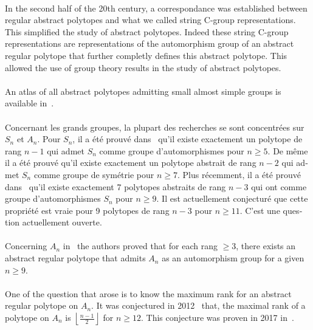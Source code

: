 \paragraph{}
In the second half of the 20th century, a correspondance was established between regular abstract polytopes and what we called string C-group representations. This simplified the study of abstract polytopes. Indeed these string C-group representations are representations of the automorphism group of an abstract regular polytope that further completly defines this abstract polytope. This allowed the use of group theory results in the study of abstract polytopes.

\paragraph{}
An atlas of all abstract polytopes admitting small almost simple groups is available in~\cite{atlasPolytopes}.

\begin{otherlanguage}{french}

\paragraph{}
Concernant les grands groupes, la plupart des recherches se sont concentrées sur $S_n$ et $A_n$. Pour $S_n$, il a été prouvé dans~\cite{highRankSym} qu'il existe exactement un polytope de rang $n-1$ qui admet $S_n$ comme groupe d'automorphismes pour $n \ge 5$. De même il a été prouvé qu'il existe exactement un polytope abstrait de rang $n-2$ qui admet $S_n$ comme groupe de symétrie pour $n \ge 7$. Plus récemment, il a été prouvé dans~\cite{leemansTransactions} qu'il existe exactement 7 polytopes abstraits de rang $n-3$ qui ont comme groupe d'automorphismes $S_n$ pour $n \ge 9$. Il est actuellement conjecturé que cette propriété est vraie pour 9 polytopes de rang $n-3$ pour $n \ge 11$. C'est une question actuellement ouverte.

\end{otherlanguage}

\paragraph{}
Concerning $A_n$ in~\cite{highRankAlternating} the authors proved that for each rang $\ge 3$, there exists an abstract regular polytope that admits $A_n$ as an automorphism group for a given $n \ge 9$.

\paragraph{}
One of the question that arose is to know the maximum rank for an abstract regular polytope on $A_n$. It was conjectured in 2012~\cite{A12PolytopesRank} that, the maximal rank of a polytope on $A_n$ is $\left \lfloor \frac{n-1}{2} \right \rfloor$ for $n \ge 12$. This conjecture was proven in 2017 in~\cite{highestRankOfAn}.

